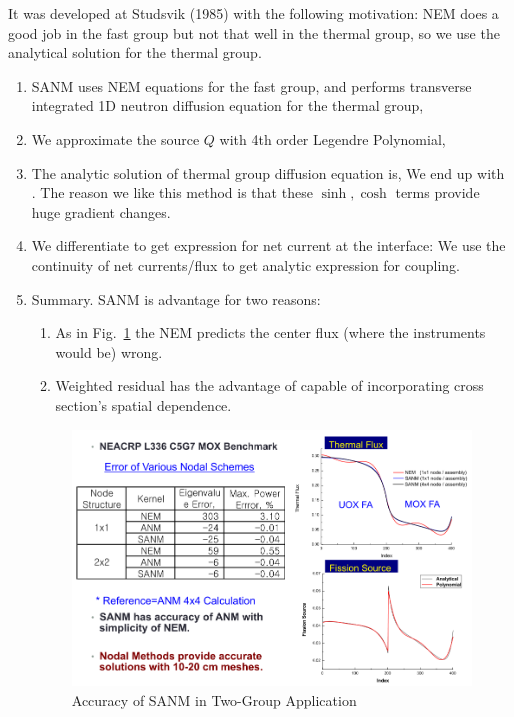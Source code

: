 \documentclass{school-22.211-notes}
\begin{document}
\clearpage
{}
It was developed at Studsvik (1985) with the following motivation: NEM does a good job in the fast group but not that well in the thermal group, so we use the analytical solution for the thermal group. 
  \begin{enumerate}
  \item SANM uses NEM equations for the fast group, and performs transverse integrated 1D neutron diffusion equation for the thermal group, 

  \item We approximate the source $Q$ with 4th order Legendre Polynomial, 
    
  \item The analytic solution of thermal group diffusion equation is, 
    We end up with . The reason we like this method is that these $\sinh, \cosh$ terms provide huge gradient changes. 

  \item We differentiate to get expression for net current at the interface: 
    We use the continuity of net currents/flux to get analytic expression for coupling. 

\item Summary. SANM is advantage for two reasons:
  \begin{enumerate}
    \item As in Fig.~\ref{SANM-accuracy} the NEM predicts the center flux (where the instruments would be) wrong. 
    \item Weighted residual has the advantage of capable of incorporating cross section's spatial dependence. 
  \end{enumerate}

    \begin{figure}[ht]
      \centering
      \includegraphics[width=5in]{images/methd/SANM-accuracy.png}
      \caption{Accuracy of SANM in Two-Group Application} \label{SANM-accuracy}
    \end{figure} 
  \end{enumerate}
\end{document}
